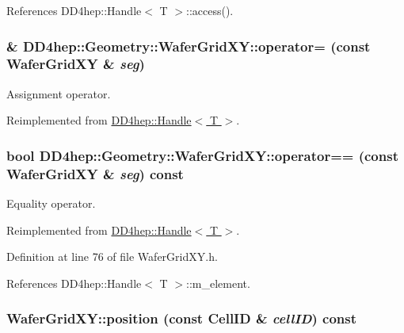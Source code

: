 References DD4hep::Handle$<$ T $>$::access().\hypertarget{class_d_d4hep_1_1_geometry_1_1_wafer_grid_x_y_a3b2e049dcb236d6959273c1b2f779789}{
\subsubsection[{operator=}]{\& DD4hep::Geometry::WaferGridXY::operator= (const {\bf WaferGridXY} \& {\em seg})}}
\label{class_d_d4hep_1_1_geometry_1_1_wafer_grid_x_y_a3b2e049dcb236d6959273c1b2f779789}


Assignment operator. 

Reimplemented from \hyperlink{class_d_d4hep_1_1_handle_a9bbf8f498df42e81ad26fb00233505a6}{DD4hep::Handle$<$ T $>$}.\hypertarget{class_d_d4hep_1_1_geometry_1_1_wafer_grid_x_y_aab6b6ac50d9ce1f24ef7c6e0cb645ab1}{
\subsubsection[{operator==}]{\setlength{\rightskip}{0pt plus 5cm}bool DD4hep::Geometry::WaferGridXY::operator== (const {\bf WaferGridXY} \& {\em seg}) const}}
\label{class_d_d4hep_1_1_geometry_1_1_wafer_grid_x_y_aab6b6ac50d9ce1f24ef7c6e0cb645ab1}


Equality operator. 

Reimplemented from \hyperlink{class_d_d4hep_1_1_handle_a618470283b3a2cc5ed0545fec90dc759}{DD4hep::Handle$<$ T $>$}.

Definition at line 76 of file WaferGridXY.h.

References DD4hep::Handle$<$ T $>$::m\_\-element.\hypertarget{class_d_d4hep_1_1_geometry_1_1_wafer_grid_x_y_a1ee836fcb785e9058fbafd1b3c29e2b7}{
\subsubsection[{position}]{ WaferGridXY::position (const CellID \& {\em cellID}) const}}
\label{class_d_d4hep_1_1_geometry_1_1_wafer_grid_x_y_a1ee836fcb785e9058fbafd1b3c29e2b7}


